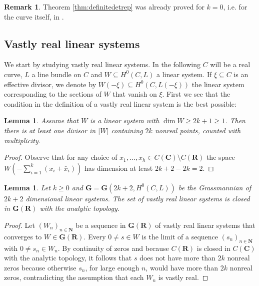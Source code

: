 \documentclass[12pt]{amsart}
\newcounter{thmcounter}
\numberwithin{equation}{section}
\numberwithin{thmcounter}{section}
\newtheorem{lemma}[thmcounter]{Lemma}
\theoremstyle{definition}
\newtheorem{remark}[thmcounter]{Remark}
\theoremstyle{claim}
\newcommand{\nN}{\mathbf{N}}
\newcommand{\nR}{\mathbf{R}}
\newcommand{\nC}{\mathbf{C}}
\newcommand{\nG}{\mathbf{G}}
\begin{document}
	\begin{remark} 
	 Theorem \ref{thm:definitedetrep} was already proved for $k=0$, i.e. for the curve itself, in \cite{shamovichvinnikov}.
\end{remark}




 
\subsection{Vastly real linear systems}

We start by studying vastly real linear systems. In the following $C$ will be a real curve, $L$ a line bundle on $C$ and  $W\subseteq H^0(C,L)$ a linear system. If $\xi\subseteq C$ is an effective divisor, we denote by $W(-\xi) \subseteq H^0(C,L(-\xi))$ the linear system corresponding to the sections of $W$ that vanish on $\xi$. First we see that the condition in the definition of a vastly real linear system is the best possible:

\begin{lemma}\label{lem:mrdim}
 Assume that $W$ is a linear system with $\dim W\geq 2k+1\geq 1$.  Then there is at least one divisor in $|W|$ containing $2k$ nonreal points, counted with multiplicity.
\end{lemma}
\begin{proof} Observe that for any choice of $x_1,\ldots,x_h\in C(\nC)\setminus C(\nR)$ the space $W(-\sum_{i=1}^k (x_i+\bar{x}_i))$  has dimension at least $2k+2-2k=2$. 
\end{proof}

\begin{lemma}\label{lem:vastlyrealclosed}
 Let $k\geq0$ and $\nG=\nG(2k+2,H^0(C,L))$ be the Grassmannian of $2k+2$ dimensional linear systems. The set of vastly real linear systems is closed in $\nG(\nR)$ with the analytic topology.
\end{lemma}

\begin{proof}
 Let $(W_n)_{n\in\nN}$ be a sequence in $\nG(\nR)$ of vastly real linear systems that converges to $W\in\nG(\nR)$. Every $0\neq s\in W$ is the limit of a sequence $(s_n)_{n\in\nN}$ with $0\neq s_n\in W_n$. By continuity of zeros and because $C(\nR)$ is closed in $C(\nC)$ with the analytic topology, it follows that $s$ does not have more than $2k$ nonreal zeros because otherwise $s_n$, for large enough $n$, would have more than $2k$ nonreal zeros, contradicting the assumption that each $W_n$ is vastly real.
\end{proof}
\end{document}
